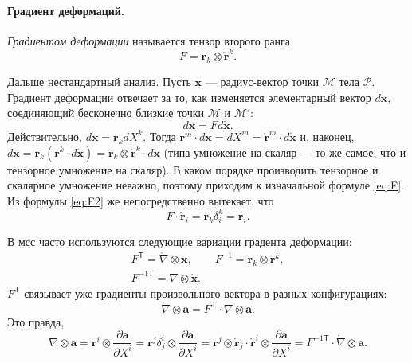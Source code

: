 \paragraph{Градиент деформаций.}
\begin{definition*}
  \emph{Градиентом деформации} называется тензор второго ранга 
  \begin{equation}\label{eq:F2}
    F = \mathbf{r}_k \otimes \mathring{\mathbf{r}}^k.
  \end{equation}
\end{definition*}
Дальше нестандартный анализ. Пусть $ \mathbf{x} $ --- радиус-вектор точки $
\mathcal M $ тела $ \mathcal P $. Градиент деформации отвечает за то, как
изменяется элементарный
вектор $ d\mathbf{x} $, соединяющий бесконечно близкие точки $ \mathcal M $ и $
\mathcal M'$: 
\begin{equation}\label{eq:F}
  d\mathbf{x} = F d\mathbf{\mathring{x}}.
\end{equation}
Действительно, $ d\mathbf{x} = \mathbf{r}_k dX^k $. Тогда $ \mathbf{r}^m\cdot
d\mathbf{x} = dX^m = \mathring{\mathbf{r}}^m\cdot d\mathbf{\mathring{x}} $ и,
наконец, $ d\mathbf{x} = \mathbf{r}_k (\mathbf{r}^k\cdot d\mathring{\mathbf{x}})
= \mathbf{r}_k
\otimes\mathbf{\mathring{r}}^k \cdot
d\mathbf{\mathring{x}}$ (типа умножение на скаляр --- то же самое, что и
тензорное умножение на скаляр). В каком порядке производить тензорное и
скалярное умножение неважно, поэтому приходим к изначальной формуле
\eqref{eq:F}. Из формулы \eqref{eq:F2} же непосредственно вытекает, что  
\[
  F \cdot \mathring{\mathbf{r}}_i = \mathbf{r}_k \delta^k_i = \mathbf{r}_i.
\]

В мсс часто используются следующие вариации градента деформации: 
\begin{gather*}
  F^{\mathsf T} = \mathring{\nabla}\otimes \mathbf x, \qquad F^{-1} =
  \mathring{\mathbf{r}}_k \otimes \mathbf{r}^k, \\
  F^{-1\mathsf T} = \nabla \otimes \mathring{\mathbf{x}}.
\end{gather*}
$ F^{\mathsf T} $ связывает уже градиенты произвольного вектора в
разных конфигурациях: 
\[
  \mathring{\nabla}\otimes \mathbf{a} = F^{\mathsf T}\cdot \nabla \otimes
  \mathbf{a}.
\]
Это правда, 
\[
  \nabla \otimes \mathbf{a} = \mathbf{r}^i \otimes \frac{\partial
  \mathbf{a}}{\partial X^i} = \mathbf{r}^j \delta^{i}_{j} \otimes \frac{\partial
\mathbf{a}}{\partial X^i} = \mathbf{r}^j \otimes \mathring{\mathbf{r}}_j \cdot
\mathring{\mathbf{r}}^i \otimes \frac{\partial \mathbf{a}}{\partial X^i} =
F^{-1\mathsf T} \cdot \mathring{\nabla}\otimes \mathbf{a}.
\]


